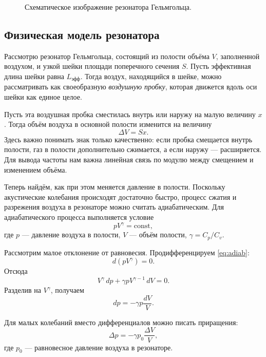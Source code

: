 \documentclass[a4paper,12pt]{article}
\begin{document}
	\begin{figure}[H]
		\centering
		\caption{Схематическое изображение резонатора Гельмгольца.}
	\end{figure}
	
	\subsection{Физическая модель резонатора}
	
	Рассмотрю резонатор Гельмгольца, состоящий из полости объёма \(V\), заполненной воздухом, и узкой шейки площади поперечного сечения \(S\). Пусть эффективная длина шейки равна \(L_{\text{эфф}}\). Тогда воздух, находящийся в шейке, можно рассматривать как своеобразную \textit{воздушную пробку}, которая движется вдоль оси шейки как единое целое.
	
	Пусть эта воздушная пробка сместилась внутрь или наружу на малую величину \(x\). Тогда объём воздуха в основной полости изменится на величину
	\begin{equation}
		\Delta V = Sx.
		\label{eq:dV}
	\end{equation}
	Здесь важно понимать знак только качественно: если пробка смещается внутрь полости, газ в полости дополнительно сжимается, а если наружу --- расширяется. Для вывода частоты нам важна линейная связь по модулю между смещением и изменением объёма.
	
	\medskip
	
	Теперь найдём, как при этом меняется давление в полости. Поскольку акустические колебания происходят достаточно быстро, процесс сжатия и разрежения воздуха в резонаторе можно считать адиабатическим. Для адиабатического процесса выполняется условие
	\begin{equation}
		pV^\gamma=\mathrm{const},
		\label{eq:adiab}
	\end{equation}
	где \(p\) --- давление воздуха в полости, \(V\) --- объём полости, \(\gamma=C_p/C_v\).
	
	Рассмотрим малое отклонение от равновесия. Продифференцируем \eqref{eq:adiab}:
	\[
	d(pV^\gamma)=0.
	\]
	Отсюда
	\[
	V^\gamma\,dp+\gamma pV^{\gamma-1}\,dV=0.
	\]
	Разделив на \(V^\gamma\), получаем
	\begin{equation}
		dp=-\gamma p\frac{dV}{V}.
		\label{eq:dp}
	\end{equation}
	
	Для малых колебаний вместо дифференциалов можно писать приращения:
	\begin{equation}
		\Delta p=-\gamma p_0\frac{\Delta V}{V},
		\label{eq:deltap}
	\end{equation}
	где \(p_0\) --- равновесное давление воздуха в резонаторе.
	
\end{document}
